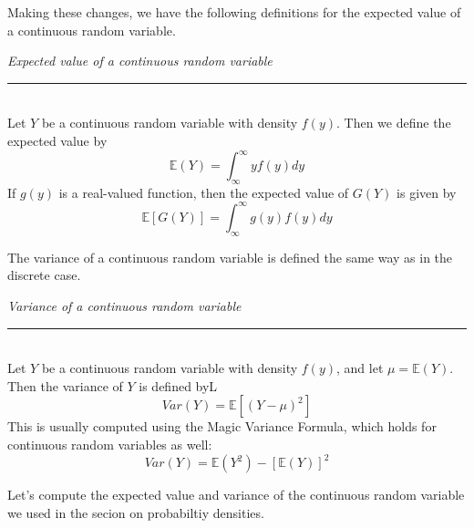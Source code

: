 \documentclass[12pt]{article}
\theoremstyle{definition}
\theoremstyle{remark}
\def\E{{\mathbb E}}
\begin{document}
Making these changes, we have the following definitions for the expected value of a continuous random variable.

\begin{framed}
\emph{Expected value of a continuous random variable}\\
  \rule{\dimexpr{}\fboxrule}{.1pt} \\
Let $Y$ be a continuous random variable with density $f(y)$. Then we define the expected value by
\[
\E(Y) = \int_{\infty}^\infty y f(y) dy
\]
If $g(y)$ is a real-valued function, then the expected value of $G(Y)$ is given by
\[
\E[G(Y)] = \int_{\infty}^\infty g(y) f(y) dy
\]
\end{framed}


The variance of a continuous random variable is defined the same way as in the discrete case.


\begin{framed}
\emph{Variance of a continuous random variable}\\
  \rule{\dimexpr{}\fboxrule}{.1pt} \\
Let $Y$ be a continuous random variable with density $f(y)$, and let $\mu = \E(Y)$. Then the variance of $Y$ is defined byL
\[
Var(Y) = \E[(Y - \mu)^2]
\]
This is usually computed using the Magic Variance Formula, which holds for continuous random variables as well:
\[
Var(Y) = \E(Y^2) - [\E(Y)]^2
\]
\end{framed}

Let's compute the expected value and variance of the continuous random variable we used in the secion on probabiltiy densities.
\end{document}
